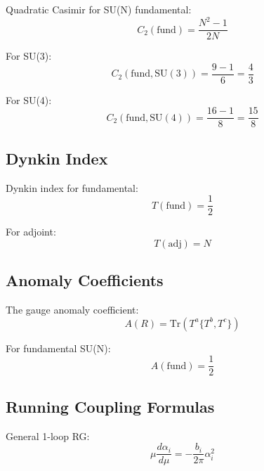 \documentclass[11pt,a4paper]{article}
\theoremstyle{definition}
\begin{document}
Quadratic Casimir for SU(N) fundamental:
\begin{equation}
\label{eq:casimir-fund}
C_2(\text{fund}) = \frac{N^2 - 1}{2N}
\end{equation}

For SU(3):
\begin{equation}
\label{eq:casimir-su3}
C_2(\text{fund}, \text{SU}(3)) = \frac{9 - 1}{6} = \frac{4}{3}
\end{equation}

For SU(4):
\begin{equation}
\label{eq:casimir-su4}
C_2(\text{fund}, \text{SU}(4)) = \frac{16 - 1}{8} = \frac{15}{8}
\end{equation}

\subsection{Dynkin Index}
\label{subsec:dynkin}

Dynkin index for fundamental:
\begin{equation}
\label{eq:dynkin-fund}
T(\text{fund}) = \frac{1}{2}
\end{equation}

For adjoint:
\begin{equation}
\label{eq:dynkin-adj}
T(\text{adj}) = N
\end{equation}

\subsection{Anomaly Coefficients}
\label{subsec:anomaly}

The gauge anomaly coefficient:
\begin{equation}
\label{eq:anomaly-coeff}
A(R) = \text{Tr}(T^a\{T^b, T^c\})
\end{equation}

For fundamental SU(N):
\begin{equation}
\label{eq:anomaly-fund}
A(\text{fund}) = \frac{1}{2}
\end{equation}

\subsection{Running Coupling Formulas}
\label{subsec:running}

General 1-loop RG:
\begin{equation}
\label{eq:rg-general}
\mu \frac{d\alpha_i}{d\mu} = -\frac{b_i}{2\pi} \alpha_i^2
\end{equation}
\end{document}
